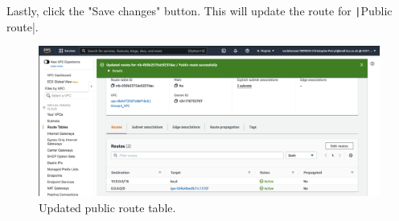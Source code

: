 Lastly, click the "Save changes" button.
This will update the route for \texttt|Public route|.

\begin{figure}[!htbp]
    \centering
    \includegraphics[width=\textwidth]{resources/vpc/routes/vpc-public-route-after}
    \caption{Updated public route table.}
    \label{fig:vpc-public-route-after}
\end{figure}
